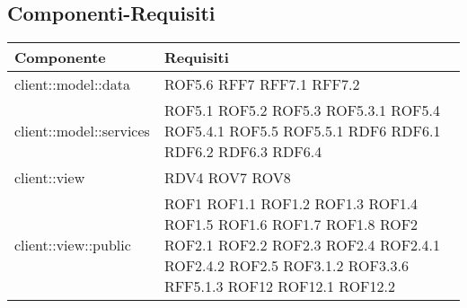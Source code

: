 \subsection{Componenti-Requisiti} %
\label{sub:componenti_requisiti}
\begin{center}
\def\arraystretch{1.5}
\bgroup
\begin{longtable}{| p{9cm} | p{4cm} |}
\hline
\textbf{Componente} & \textbf{Requisiti} \\
\hline
client::model::data  &  ROF5.6 \newline RFF7 \newline RFF7.1 \newline RFF7.2 \\
\hline
client::model::services  &  ROF5.1 \newline ROF5.2 \newline ROF5.3 \newline ROF5.3.1  \newline ROF5.4 \newline ROF5.4.1 \newline ROF5.5 \newline ROF5.5.1 \newline RDF6 \newline RDF6.1 \newline RDF6.2 \newline RDF6.3 \newline RDF6.4 \\
\hline
client::view  & RDV4 \newline ROV7 \newline ROV8 \\
\hline
client::view::public  &  ROF1 \newline ROF1.1 \newline ROF1.2 \newline ROF1.3 \newline ROF1.4 \newline ROF1.5 \newline ROF1.6 \newline ROF1.7 \newline ROF1.8 \newline ROF2 \newline ROF2.1 \newline ROF2.2 \newline ROF2.3 \newline ROF2.4 \newline ROF2.4.1 \newline ROF2.4.2 \newline ROF2.5 \newline ROF3.1.2 \newline ROF3.3.6 \newline RFF5.1.3 \newline ROF12 \newline ROF12.1 \newline ROF12.2 \\

\end{longtable}
\end{center}
